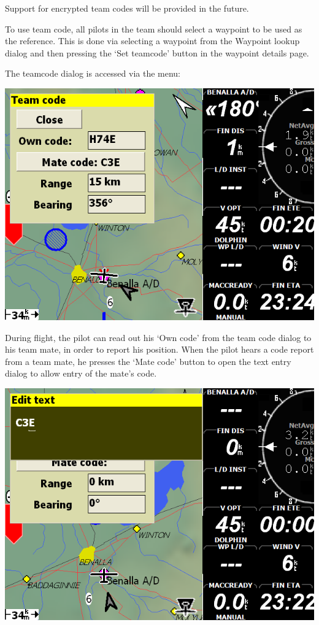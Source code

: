 \documentclass[a4paper,12pt]{refrep}
\begin{document}
  Support for encrypted team codes will be provided in the future.

  To use team code, all pilots in the team should select a waypoint to
  be used as the reference.  This is done via selecting a waypoint
  from the Waypoint lookup dialog and then pressing the `Set teamcode'
  button in the waypoint details page.

  The teamcode dialog is accessed via the menu:

   \blink{}

\begin{center}
\includegraphics[angle=0,width=\linewidth,keepaspectratio='true']{figures/fig-teamcode1.png}
\end{center}

  During flight, the pilot can read out his `Own code' from the team
  code dialog to his team mate, in order to report his position.  When
  the pilot hears a code report from a team mate, he presses the `Mate
  code' button to open the text entry dialog to allow entry of the
  mate's code.

\begin{center}
\includegraphics[angle=0,width=\linewidth,keepaspectratio='true']{figures/fig-teamcode2.png}
\end{center}
\end{document}
